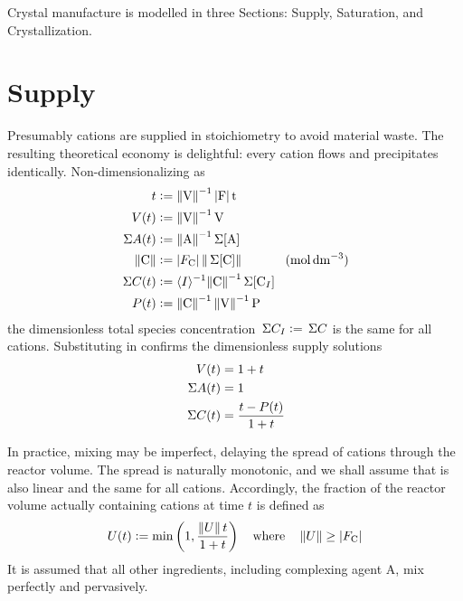 \documentclass[a4paper]{base}
\newcommand{\stc}[1]{\M{\langle #1 \rangle}}
\begin{document}
    Crystal manufacture is modelled in three Sections: Supply, Saturation, and Crystallization.

\section{Supply}\label{sec:Supply}
    Presumably cations are supplied in stoichiometry to avoid material waste. The resulting theoretical economy is delightful: every cation flows and precipitates identically. 
    Non-dimensionalizing as
    \begin{equation} \label{def:Supply:ND}
        \begin{aligned}
            t &\deq \dn{\norm{V}^{-1}\mds{F} t} \\
            V(t) &\deq \dn{\norm{V}^{-1} V} \\
            \tot{A}(t) &\deq  \dn{\norm{A}}^{-1} \tot{\cn{A}} \\
            \dn{\norm{C}} &\deq \mds{F_{\dn{C}}} \norm{\tot{\cn{C}}}\ &\un{mol\, dm^{-3}}\\
            \tot{C}(t) &\deq \stc{I}^{-1} \dn{\norm{C}}^{-1} \tot{\cn[I]{C}} \\
            P(t) &\deq \dn{\norm{C}^{-1}\norm{V}^{-1} P} \\
        \end{aligned}
    \end{equation}
    the dimensionless total species concentration $\,\Sigma{C_{I}}\mathrel{\mathop:}=\,\Sigma{C}$ is the same for all cations. Substituting  in  confirms the dimensionless supply solutions
    \begin{equation} \label{sol:Supply:Tot}
        \begin{aligned}
            V(t) &= 1+t\\
            \,\Sigma{A}(t) &= 1\\
            \,\Sigma{C}(t) &= \frac{t - P(t)}{1+t} \\
        \end{aligned}
    \end{equation}

    In practice, mixing may be imperfect, delaying the spread of cations through the reactor volume. The spread is naturally monotonic, and we shall assume that is also linear and the same for all cations. Accordingly, the fraction of the reactor volume actually containing cations at time $t$ is defined as
    \begin{equation} \label{def:Supply:U}
        U(t) \deq \min \left(1,\frac{\norm{U} t}{1+t}\right) \QT{where} \norm{U} \geq \mds{F_{\dn{C}}}
    \end{equation}
    It is assumed that all other ingredients, including complexing agent A, mix perfectly and pervasively.
\end{document}

